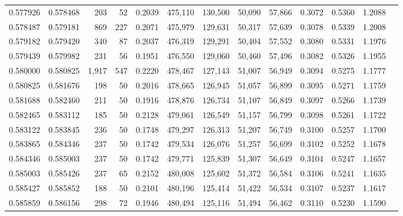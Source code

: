 \begin{tabular}{rrrrrrrrrrrrr}
0.577926 & 0.578468 &   203 &  52 &                                     0.2039 & 475,110 & 130,500 &  50,090 &  57,866 & 0.3072 & 0.5360 & 1.2088 \\
0.578487 & 0.579181 &   869 & 227 &                                     0.2071 & 475,979 & 129,631 &  50,317 &  57,639 & 0.3078 & 0.5339 & 1.2008 \\
0.579182 & 0.579420 &   340 &  87 &                                     0.2037 & 476,319 & 129,291 &  50,404 &  57,552 & 0.3080 & 0.5331 & 1.1976 \\
0.579439 & 0.579982 &   231 &  56 &                                     0.1951 & 476,550 & 129,060 &  50,460 &  57,496 & 0.3082 & 0.5326 & 1.1955 \\
0.580000 & 0.580825 & 1,917 & 547 &                                     0.2220 & 478,467 & 127,143 &  51,007 &  56,949 & 0.3094 & 0.5275 & 1.1777 \\
0.580825 & 0.581676 &   198 &  50 &                                     0.2016 & 478,665 & 126,945 &  51,057 &  56,899 & 0.3095 & 0.5271 & 1.1759 \\
0.581688 & 0.582460 &   211 &  50 &                                     0.1916 & 478,876 & 126,734 &  51,107 &  56,849 & 0.3097 & 0.5266 & 1.1739 \\
0.582465 & 0.583112 &   185 &  50 &                                     0.2128 & 479,061 & 126,549 &  51,157 &  56,799 & 0.3098 & 0.5261 & 1.1722 \\
0.583122 & 0.583845 &   236 &  50 &                                     0.1748 & 479,297 & 126,313 &  51,207 &  56,749 & 0.3100 & 0.5257 & 1.1700 \\
0.583865 & 0.584346 &   237 &  50 &                                     0.1742 & 479,534 & 126,076 &  51,257 &  56,699 & 0.3102 & 0.5252 & 1.1678 \\
0.584346 & 0.585003 &   237 &  50 &                                     0.1742 & 479,771 & 125,839 &  51,307 &  56,649 & 0.3104 & 0.5247 & 1.1657 \\
0.585003 & 0.585426 &   237 &  65 &                                     0.2152 & 480,008 & 125,602 &  51,372 &  56,584 & 0.3106 & 0.5241 & 1.1635 \\
0.585427 & 0.585852 &   188 &  50 &                                     0.2101 & 480,196 & 125,414 &  51,422 &  56,534 & 0.3107 & 0.5237 & 1.1617 \\
0.585859 & 0.586156 &   298 &  72 &                                     0.1946 & 480,494 & 125,116 &  51,494 &  56,462 & 0.3110 & 0.5230 & 1.1590 \\

\end{tabular}

